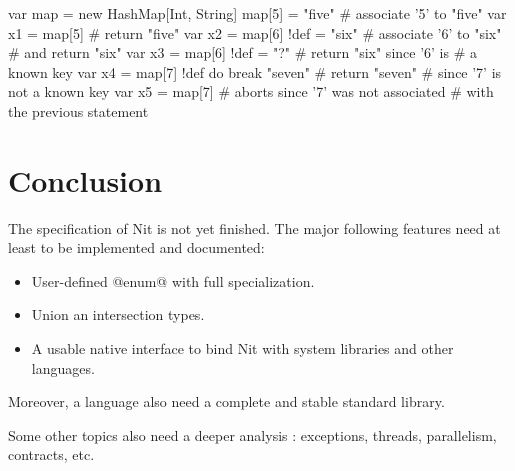 \begin{lst}
var map = new HashMap[Int, String]
map[5] = "five" # associate '5' to "five"
var x1 = map[5] # return "five"
var x2 = map[6] !def = "six" # associate '6' to "six" 
				# and return "six"
var x3 = map[6] !def = "?" # return "six" since '6' is
				# a known key
var x4 = map[7] !def do break "seven" # return "seven" 
				# since '7' is not a known key
var x5 = map[7] # aborts since '7' was not associated 
				# with the previous statement
\end{lst}

\section{Conclusion}

The specification of Nit is not yet finished.
The major following features need at least to be implemented and documented:
\begin{itemize}
\item User-defined @enum@ with full specialization.
\item Union an intersection types.
\item A usable native interface to bind Nit with system libraries and other languages.
\end{itemize}
Moreover, a language also need a complete and stable standard library.

Some other topics also need a deeper analysis : exceptions, threads, parallelism, contracts, etc.

